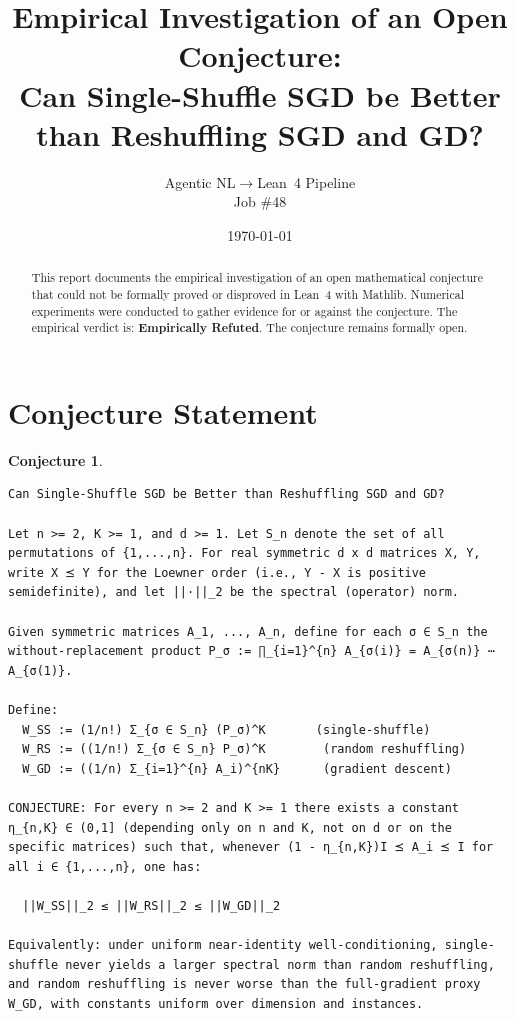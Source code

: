 \documentclass[11pt]{article}
\title{Empirical Investigation of an Open Conjecture:\\
Can Single-Shuffle SGD be Better than Reshuffling SGD and GD?}
\author{Agentic NL$\to$Lean~4 Pipeline \\ \small Job \#48}
\date{\today}
\newtheorem{conjecture}{Conjecture}
\begin{document}
\maketitle

\begin{abstract}
This report documents the empirical investigation of an open mathematical conjecture
that could not be formally proved or disproved in Lean~4 with Mathlib.
Numerical experiments were conducted to gather evidence for or against the conjecture.
The empirical verdict is: \textbf{\textcolor{red!70!black}{Empirically Refuted}}.
The conjecture remains formally open.
\end{abstract}

\section{Conjecture Statement}

\begin{conjecture}
\begin{lstlisting}
Can Single-Shuffle SGD be Better than Reshuffling SGD and GD?

Let n >= 2, K >= 1, and d >= 1. Let S_n denote the set of all permutations of {1,...,n}. For real symmetric d x d matrices X, Y, write X ⪯ Y for the Loewner order (i.e., Y - X is positive semidefinite), and let ||·||_2 be the spectral (operator) norm.

Given symmetric matrices A_1, ..., A_n, define for each σ ∈ S_n the without-replacement product P_σ := ∏_{i=1}^{n} A_{σ(i)} = A_{σ(n)} ⋯ A_{σ(1)}.

Define:
  W_SS := (1/n!) Σ_{σ ∈ S_n} (P_σ)^K       (single-shuffle)
  W_RS := ((1/n!) Σ_{σ ∈ S_n} P_σ)^K        (random reshuffling)
  W_GD := ((1/n) Σ_{i=1}^{n} A_i)^{nK}      (gradient descent)

CONJECTURE: For every n >= 2 and K >= 1 there exists a constant η_{n,K} ∈ (0,1] (depending only on n and K, not on d or on the specific matrices) such that, whenever (1 - η_{n,K})I ⪯ A_i ⪯ I for all i ∈ {1,...,n}, one has:

  ||W_SS||_2 ≤ ||W_RS||_2 ≤ ||W_GD||_2

Equivalently: under uniform near-identity well-conditioning, single-shuffle never yields a larger spectral norm than random reshuffling, and random reshuffling is never worse than the full-gradient proxy W_GD, with constants uniform over dimension and instances.
\end{lstlisting}
\end{conjecture}
\end{document}
